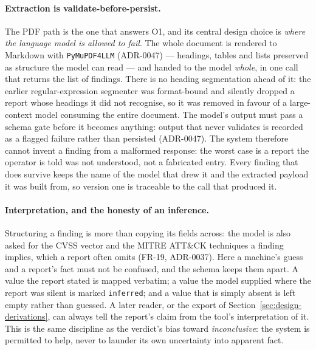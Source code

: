 \paragraph{Extraction is validate-before-persist.} The PDF path is the one that
answers O1, and its central design choice is \emph{where the language model is
allowed to fail}. The whole document is rendered to Markdown with
\texttt{PyMuPDF4LLM} (ADR-0047) --- headings, tables and lists preserved as
structure the model can read --- and handed to the model \emph{whole}, in one call
that returns the list of findings. There is no heading segmentation ahead of it: the
earlier regular-expression segmenter was format-bound and silently dropped a report
whose headings it did not recognise, so it was removed in favour of a large-context
model consuming the entire document. The model's output must pass a schema gate before
it becomes anything: output that never validates is recorded as a flagged failure
rather than persisted (ADR-0047). The system therefore cannot invent a finding from a
malformed response: the worst case is a report the operator is told was not
understood, not a fabricated entry. Every finding that does survive keeps the name of
the model that drew it and the extracted payload it was built from, so version one is
traceable to the call that produced it.

\paragraph{Interpretation, and the honesty of an inference.} Structuring a finding
is more than copying its fields across: the model is also asked for the CVSS vector
and the MITRE ATT\&CK techniques a finding implies, which a report often omits
(FR-19, ADR-0037). Here a machine's guess and a report's fact must not be confused,
and the schema keeps them apart. A value the report stated is mapped verbatim; a
value the model supplied where the report was silent is marked \texttt{inferred};
and a value that is simply absent is left empty rather than guessed. A later
reader, or the export of Section~\ref{sec:design-derivations}, can always tell
the report's claim from the tool's interpretation of it. This is the same
discipline as the verdict's bias toward \emph{inconclusive}: the system is permitted
to help, never to launder its own uncertainty into apparent fact.

